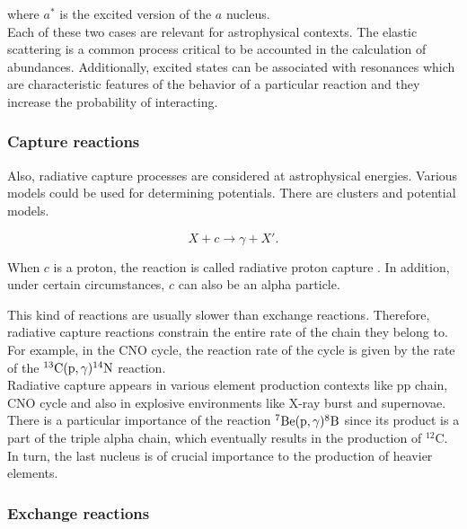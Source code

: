 \documentclass[openany]{book}
\begin{document}
where $a^{*}$ is the excited version of the $a$ nucleus. \\

Each of these two cases are relevant for astrophysical contexts. The elastic scattering is a common process critical to be accounted in the calculation of abundances. Additionally, excited states can be associated with resonances which are characteristic features of the behavior of a particular reaction and they increase the probability of interacting. \\

\subsubsection{Capture reactions} \label{ssub:captureReactions}

Also, radiative capture processes are considered at astrophysical energies. Various models could be used for determining potentials. There are clusters and potential models.

\begin{equation}  \label{eq:nuclearReaction_capture}
	X + c \rightarrow  \gamma + X'.
\end{equation}

When $c$ is a proton, the reaction is called radiative proton capture \cite{brune_davids_2015}. In addition, under certain circumstances, $c$ can also be an alpha particle. 

This kind of reactions are usually slower than exchange reactions. Therefore, radiative capture reactions constrain the entire rate of the chain they belong to. For example, in the CNO cycle, the reaction rate of the cycle is given by the rate of the $\mathrm{{}^{13}C(p, \gamma){}^{14}N}$ reaction. \\

Radiative capture appears in various element production contexts like pp chain, CNO cycle and also in explosive environments like X-ray burst and supernovae. There is a particular importance of the reaction $\mathrm{{}^{7}Be(p, \gamma){}^{8}B}$ since its product is a part of the triple alpha chain, which eventually results in the production of $\mathrm{{}^{12}C}$. In turn, the last nucleus is of crucial importance to the production of heavier elements. 

\subsubsection{Exchange reactions}  \label{ssub:exchangeReactions}
\end{document}

